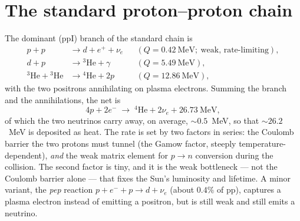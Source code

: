 \documentclass[11pt]{article}
\begin{document}
\section{The standard proton--proton chain}

The dominant (ppI) branch of the standard chain is
\begin{align}
p + p &\to d + e^{+} + \nu_e && (Q = 0.42~\text{MeV};\ \text{weak, rate-limiting}),\\
d + p &\to {}^3\mathrm{He} + \gamma && (Q = 5.49~\text{MeV}),\\
{}^3\mathrm{He} + {}^3\mathrm{He} &\to {}^4\mathrm{He} + 2p && (Q = 12.86~\text{MeV}),
\end{align}
with the two positrons annihilating on plasma electrons. Summing the branch and the annihilations, the
net is
\begin{equation}
4p + 2e^- \;\longrightarrow\; {}^4\mathrm{He} + 2\nu_e + 26.73~\text{MeV},
\label{eq:standard-net}
\end{equation}
of which the two neutrinos carry away, on average, ${\sim}0.5$~MeV, so that ${\sim}26.2$~MeV is
deposited as heat. The rate is set by two factors in series: the Coulomb barrier the two protons must
tunnel (the Gamow factor, steeply temperature-dependent), \emph{and} the weak matrix element for
$p\to n$ conversion during the collision. The second factor is tiny, and it is the weak bottleneck ---
not the Coulomb barrier alone --- that fixes the Sun's luminosity and lifetime. A minor variant, the
\emph{pep} reaction $p+e^-+p\to d+\nu_e$ (about $0.4\%$ of pp), captures a plasma electron instead of
emitting a positron, but is still weak and still emits a neutrino.
\end{document}
